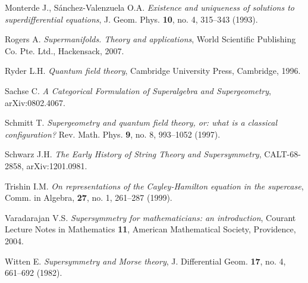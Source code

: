 \documentclass[11pt,a4paper]{report}
\theoremstyle{definition}
\begin{document}
\begin{thebibliography}{}
Monterde J., S\'anchez-Valenzuela O.A. \textit{Existence and uniqueness of solutions to superdifferential equations}, J. Geom. Phys. {\bf 10}, no. 4, 315--343 (1993).

Rogers A. \textsl{Supermanifolds. Theory and applications}, World Scientific Publishing Co. Pte. Ltd., Hackensack, 2007.

Ryder L.H. \textsl{Quantum field theory}, Cambridge University Press, Cambridge, 1996.

Sachse C.
{\it A Categorical Formulation of Superalgebra and Supergeometry}, arXiv:0802.4067.

Schmitt T. \textit{Supergeometry and quantum field theory, or: what is a classical configuration?} Rev. Math. Phys. {\bf 9}, no. 8, 993--1052 (1997).

Schwarz J.H.
{\it The Early History of String Theory and Supersymmetry},
CALT-68-2858, arXiv:1201.0981.

 Trishin I.M. 
 {\it On representations of the Cayley-Hamilton equation in
the supercase}, Comm. in Algebra, {\bf 27}, no. 1, 261--287 (1999).

Varadarajan V.S. \textsl{Supersymmetry for mathematicians: an introduction}, Courant Lecture Notes in Mathematics {\bf 11}, American Mathematical Society, Providence, 2004.

Witten E. \textit{Supersymmetry and Morse theory}, J. Differential Geom. {\bf 17}, no. 4, 661--692 (1982).

\end{thebibliography}

\newpage
{}
{}
\printindex
\end{document}
